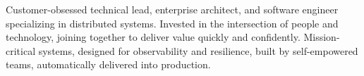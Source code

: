 

\begin{cvparagraph}

Customer-obsessed technical lead, enterprise architect, and software engineer specializing in distributed systems. Invested in the intersection of people and technology,
joining together to deliver value quickly and confidently. Mission-critical systems, designed for observability and resilience,
built by self-empowered teams, automatically delivered into production.
\end{cvparagraph}
